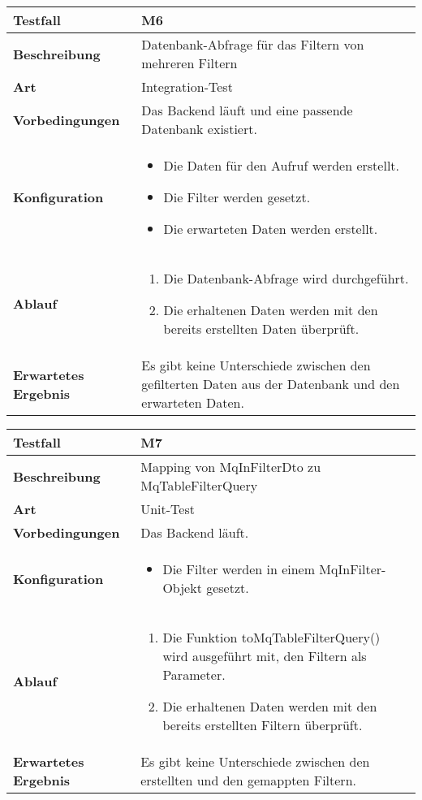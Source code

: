 \begin{longtable}{p{}|p{}}
	\hline
	\textbf{Testfall}               & \textbf{M6} \\
	\hline
	\textbf{Beschreibung}   		& Datenbank-Abfrage für das Filtern von mehreren Filtern \\
	\hline
	\textbf{Art}    				& Integration-Test \\
	\hline
	\textbf{Vorbedingungen}    		& Das Backend läuft und eine passende Datenbank existiert. \\
	\hline
	\textbf{Konfiguration}   	 	& 
	\begin{itemize}
		\item Die Daten für den Aufruf werden erstellt.
		\item Die Filter werden gesetzt.
		\item Die erwarteten Daten werden erstellt.
	\end{itemize} \\
	\hline
	\textbf{Ablauf}    				& 
	\begin{enumerate}
		\item Die Datenbank-Abfrage wird durchgeführt.
		\item Die erhaltenen Daten werden mit den bereits erstellten Daten überprüft.
	\end{enumerate} \\
	\hline
	\textbf{Erwartetes Ergebnis}    & Es gibt keine Unterschiede zwischen den gefilterten Daten aus der Datenbank und den erwarteten Daten. \\
	\hline
\end{longtable}\label{tab:testfall-M6}

\begin{longtable}{p{}|p{}}
	\hline
	\textbf{Testfall}               & \textbf{M7} \\
	\hline
	\textbf{Beschreibung}   		& Mapping von MqInFilterDto zu MqTableFilterQuery \\
	\hline
	\textbf{Art}    				& Unit-Test \\
	\hline
	\textbf{Vorbedingungen}    		& Das Backend läuft. \\
	\hline
	\textbf{Konfiguration}   	 	& 
	\begin{itemize}
		\item Die Filter werden in einem MqInFilter-Objekt gesetzt.
	\end{itemize} \\
	\hline
	\textbf{Ablauf}    				& 
	\begin{enumerate}
		\item Die Funktion toMqTableFilterQuery() wird ausgeführt mit, den Filtern als Parameter.
		\item Die erhaltenen Daten werden mit den bereits erstellten Filtern überprüft.
	\end{enumerate} \\
	\hline
	\textbf{Erwartetes Ergebnis}    & Es gibt keine Unterschiede zwischen den erstellten und den gemappten Filtern. \\
	\hline
\end{longtable}\label{tab:testfall-M7}

\newpage